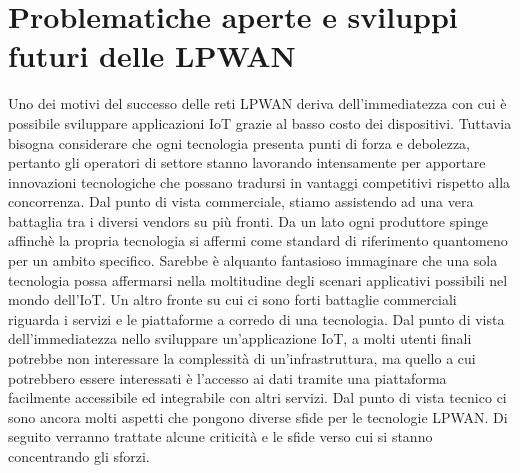 \documentclass[12pt,a4paper,openright,twoside]{report}
\begin{document}
\chapter{Problematiche aperte e sviluppi futuri delle LPWAN}
Uno dei motivi del successo delle reti LPWAN deriva dell'immediatezza con cui \`e possibile sviluppare applicazioni IoT grazie al basso costo dei dispositivi.
Tuttavia bisogna considerare che ogni tecnologia presenta punti di forza e debolezza, pertanto gli operatori di settore stanno lavorando intensamente per apportare innovazioni tecnologiche che possano tradursi in vantaggi competitivi rispetto alla concorrenza.
Dal punto di vista commerciale, stiamo assistendo ad una vera battaglia tra i diversi vendors su pi\`u fronti. 
Da un lato ogni produttore spinge affinch\`e la propria tecnologia si affermi come standard di riferimento quantomeno per un ambito specifico. Sarebbe \`e alquanto fantasioso immaginare che una sola tecnologia possa affermarsi nella moltitudine degli scenari applicativi possibili nel mondo dell'IoT.
Un altro fronte su cui ci sono forti battaglie commerciali riguarda i servizi e le piattaforme a corredo di una tecnologia. Dal punto di vista dell'immediatezza nello sviluppare un'applicazione IoT, a molti utenti finali potrebbe non interessare la complessit\`a di un'infrastruttura, ma quello a cui potrebbero essere interessati \`e l'accesso ai dati tramite una piattaforma facilmente accessibile ed integrabile con altri servizi.  
Dal punto di vista tecnico ci sono ancora molti aspetti che pongono diverse sfide per le tecnologie LPWAN. Di seguito verranno trattate alcune criticit\`a e le sfide verso cui si stanno concentrando gli sforzi. 
\end{document}
